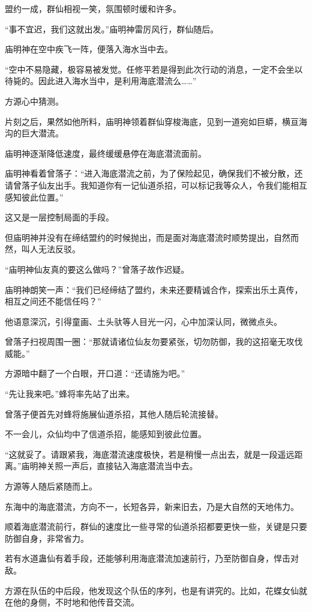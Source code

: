 \begin{this_body}
盟约一成，群仙相视一笑，氛围顿时缓和许多。

“事不宜迟，我们这就出发。”庙明神雷厉风行，群仙随后。

庙明神在空中疾飞一阵，便落入海水当中去。

“空中不易隐藏，极容易被发觉。任修平若是得到此次行动的消息，一定不会坐以待毙的。因此进入海水当中，是利用海底潜流么……”

方源心中猜测。

片刻之后，果然如他所料，庙明神领着群仙穿梭海底，见到一道宛如巨蟒，横亘海沟的巨大潜流。

庙明神逐渐降低速度，最终缓缓悬停在海底潜流面前。

庙明神看着曾落子：“进入海底潜流之前，为了保险起见，确保我们不被分散，还请曾落子仙友出手。我知道你有一记仙道杀招，可以标记我等众人，令我们能相互感知彼此位置。”

这又是一层控制局面的手段。

但庙明神并没有在缔结盟约的时候抛出，而是面对海底潜流时顺势提出，自然而然，叫人无法反驳。

“庙明神仙友真的要这么做吗？”曾落子故作迟疑。

庙明神朗笑一声：“我们已经缔结了盟约，未来还要精诚合作，探索出乐土真传，相互之间还不能信任吗？”

他语意深沉，引得童画、土头驮等人目光一闪，心中加深认同，微微点头。

曾落子扫视周围一圈：“那就请诸位仙友勿要紧张，切勿防御，我的这招毫无攻伐威能。”

方源暗中翻了一个白眼，开口道：“还请施为吧。”

“先让我来吧。”蜂将率先站了出来。

曾落子便首先对蜂将施展仙道杀招，其他人随后轮流接替。

不一会儿，众仙均中了信道杀招，能感知到彼此位置。

“这就妥了。请跟紧我，海底潜流速度极快，若是稍慢一点出去，就是一段遥远距离。”庙明神关照一声后，直接钻入海底潜流当中去。

方源等人随后紧随而上。

东海中的海底潜流，方向不一，长短各异，新来旧去，乃是大自然的天地伟力。

顺着海底潜流前行，群仙的速度比一些寻常的仙道杀招都要更快一些，关键是只要防御自身，非常省力。

若有水道蛊仙有着手段，还能够利用海底潜流加速前行，乃至防御自身，悍击对敌。

方源在队伍的中后段，他发现这个队伍的序列，也是有讲究的。比如，花蝶女仙就在他的身侧，不时地和他传音交流。


\end{this_body}
